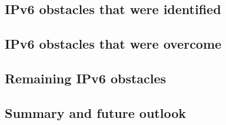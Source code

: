 \documentclass{webofc}
\begin{document}
\subsection{IPv6 obstacles that were identified}
\label{sec-obstacles-found}

\subsection{IPv6 obstacles that were overcome}
\label{sec-obstacles-fixed}

\subsection{Remaining IPv6 obstacles}
\label{sec-obstacles-left}

%
\subsection{Summary and future outlook}
\label{sec-future}

%
%
%
\end{document}
